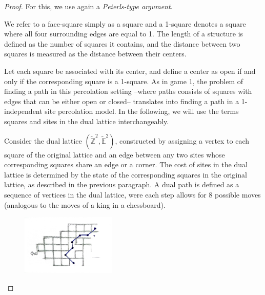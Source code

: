         \begin{proof}
            For this, we use again a \emph{Peierls-type argument}. 


            We refer to a face-square simply as a square and a 1-square denotes a square where all four surrounding edges are equal to 1. The length of a structure is defined as the number of squares it contains, and the distance between two squares is measured as the distance between their centers. 

            Let each square be associated with its center, and define a center as open if and only if the corresponding square is a 1-square. As in game 1, the problem of finding a path in this percolation setting --where paths consists of squares with edges that can be either open or closed-- translates into finding a path in a 1-independent site percolation model. In the following, we will use the terms squares and sites in the dual lattice interchangeably.

            Consider the dual lattice $(\tilde{\mathbb{Z}}^2, \tilde{\mathbb{E}}^2)$, constructed by assigning a vertex to each square of the original lattice and an edge between any two sites whose corresponding squares share an edge or a corner. The cost of sites in the dual lattice is determined by the state of the corresponding squares in the original lattice, as described in the previous paragraph. A dual path is defined as a sequence of vertices in the dual lattice, were each step allows for 8 possible moves (analogous to the moves of a king in a chessboard).

            \begin{figure}[!hbt]
            \centering
            \includegraphics[width = 0.4\textwidth]{./images/game2/pierles-type-argument.jpg}
            \end{figure}


\end{proof}
